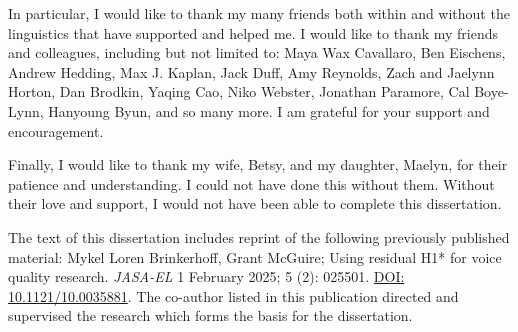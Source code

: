 \begin{acknowledgements}
    In particular, I would like to thank my many friends both within and without the linguistics that have supported and helped me. I would like to thank my friends and colleagues, including but not limited to: Maya Wax Cavallaro, Ben Eischens, Andrew Hedding, Max J. Kaplan, Jack Duff, Amy Reynolds, Zach and Jaelynn Horton, Dan Brodkin, Yaqing Cao, Niko Webster, Jonathan Paramore, Cal Boye-Lynn, Hanyoung Byun, and so many more. I am grateful for your support and encouragement. 

    Finally, I would like to thank my wife, Betsy, and my daughter, Maelyn, for their patience and understanding. I could not have done this without them. Without their love and support, I would not have been able to complete this dissertation.

    The text of this dissertation includes reprint of the following previously published material: Mykel Loren Brinkerhoff, Grant McGuire; Using residual H1* for voice quality research. \textit{JASA-EL} 1 February 2025; 5 (2): 025501. \href{https://doi.org/10.1121/10.0035881}{DOI: 10.1121/10.0035881}. The co-author listed in this publication directed and supervised the research which forms the basis for the dissertation.
\end{acknowledgements}

